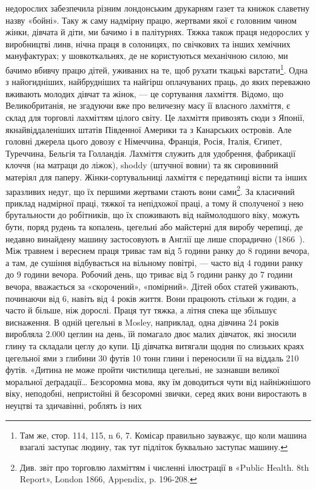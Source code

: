 \parcont{}  %
недорослих забезпечила різним лондонським друкарням газет
та книжок славетну назву «бойні». Таку ж саму надмірну
працю, жертвами якої є головним чином жінки, дівчата й діти,
ми бачимо і в палітурнях. Тяжка також праця недорослих у
виробництві линв, нічна праця в солоницях, по свічкових та інших
хемічних мануфактурах; у шовкоткальнях, де не користуються
механічною силою, ми бачимо вбивчу працю дітей, уживаних на
те, щоб рухати ткацькі варстати\footnote{
Там же, стор. 114, 115, n 6, 7. Комісар правильно зауважує,
що коли машина взагалі заступає людину, так тут підліток буквально
заступає машину.
}. Одна з найогидніших, найбрудніших
та найгірш оплачуваних праць, до яких переважно
вживають молодих дівчат та жінок, — це сортування лахміття.
Відомо, що Великобританія, не згадуючи вже про величезну масу
її власного лахміття, є склад для торговлі лахміттям цілого світу.
Це лахміття привозять сюди з Японії, якнайвіддаленіших штатів
Південної Америки та з Канарських островів. Але головні джерела
цього довозу є Німеччина, Франція, Росія, Італія, Єгипет,
Туреччина, Бельгія та Голландія. Лахміття служить для
удобрення, фабрикації клоччя (на матраци до ліжок), shoddy
(штучної вовни) та як сировинний матеріял для паперу. Жінки-сортувальниці
лахміття є передатниці віспи та інших заразливих
недуг, що їх першими жертвами стають вони сами\footnote{
Див. звіт про торговлю лахміттям і численні ілюстрації в «Public
Health. 8th Report», London 1866, Appendix, p. 196-208.
}. За класичний
приклад надмірної праці, тяжкої та непідхожої праці, а
тому й сполученої з нею брутальности до робітників, що їх споживають
від наймолодшого віку, можуть бути, поряд рудень та
копалень, цегельні або майстерні для виробу черепиці, де недавно
винайдену машину застосовують в Англії ще лише спорадично
(1866~). Між травнем і вереснем праця триває там від 5 години
ранку до 8 години вечора, а там, де сушіння відбувається на
вільному повітрі, — часто від 4 години ранку до 9 години вечора.
Робочий день, що триває від 5 години ранку до 7 години вечора,
вважається за «скорочений», «помірний». Дітей обох статей
уживають, починаючи від 6, навіть від 4 років життя. Вони працюють
стільки ж годин, а часто й більше, ніж дорослі. Праця
тут тяжка, а літня спека ще збільшує виснаження. В одній цегельні
в Mosley, наприклад, одна дівчина 24 років виробляла
\num{2.000} цеглин на день, їй помагало двоє малих дівчаток, які зносили
глину та складали цеглу до купи. Ці дівчатка витягали
щодня по слизьких краях цегельної ями з глибини 30 футів 10 тонн
глини і переносили її на віддаль 210 футів. «Дитина не може
пройти чистилища цегельні, не зазнавши великої моральної
деґрадації\dots{} Безсоромна мова, яку їм доводиться чути від найніжнішого
віку, неподобні, непристойні й безсоромні звички, серед
яких вони виростають в неуцтві та здичавінні, роблять із них
\parbreak{}  %
